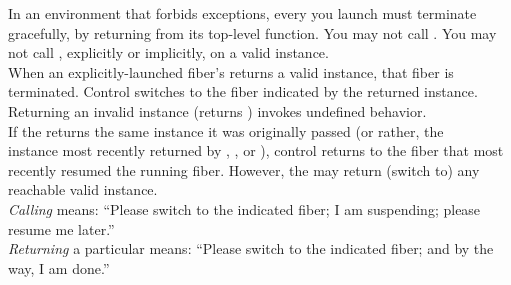 In an environment that forbids exceptions, every \fiber you launch must
terminate gracefully, by returning from its top-level function. You may not
call \unwindfib. You may not call \dtor, explicitly or implicitly, on a
valid \fiber instance.\\

When an explicitly-launched fiber's \entryfn\xspace returns a valid \fiber
instance, that fiber is terminated. Control switches to the fiber indicated by
the returned \fiber instance.\\

Returning an invalid \fiber instance (\opbool returns ) invokes
undefined behavior.\\

If the \entryfn\xspace returns the same \fiber instance it was originally
passed (or rather, the\\\fiber instance most recently returned by \resume,
\resumewith, \xtresume or \xtresumewith), control returns to the fiber that
most recently resumed the running fiber. However, the \entryfn\xspace may
return (switch to) any reachable valid \fiber instance.\\

\emph{Calling} \resume means: ``Please switch to the indicated fiber; I
am suspending; please resume me later.''\\

\emph{Returning} a particular \fiber means: ``Please switch to the indicated
fiber; and by the way, I am done.''
